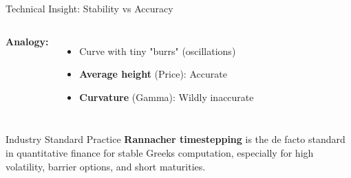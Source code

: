 \documentclass[aspectratio=169]{beamer}
\begin{document}
\begin{frame}{Technical Insight: Stability vs Accuracy}
\begin{columns}
\vspace{0.3em}
\textbf{Analogy:}
\begin{itemize}
    \item Curve with tiny "burrs" (oscillations)
    \item \textbf{Average height} (Price): Accurate
    \item \textbf{Curvature} (Gamma): Wildly inaccurate
\end{itemize}
\end{columns}

\vspace{0.5em}
\begin{alertblock}{Industry Standard Practice}
\textbf{Rannacher timestepping} is the de facto standard in quantitative finance for stable Greeks computation, especially for high volatility, barrier options, and short maturities.
\end{alertblock}

\end{frame}
\end{document}

